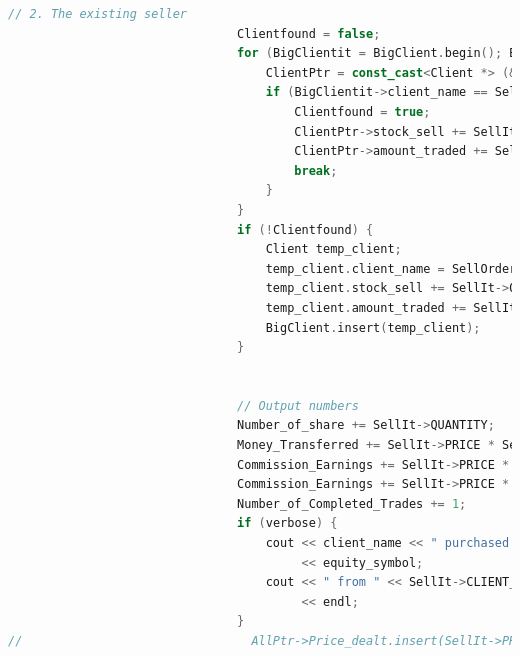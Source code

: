 \documentclass{article}
\begin{document}
\begin{lstlisting}[language=C++]
                                // 2. The existing seller
                                Clientfound = false;
                                for (BigClientit = BigClient.begin(); BigClientit != BigClient.end(); BigClientit++) {
                                    ClientPtr = const_cast<Client *> (&(*BigClientit));
                                    if (BigClientit->client_name == SellOrderPtr->CLIENT_NAME) {
                                        Clientfound = true;
                                        ClientPtr->stock_sell += SellIt->QUANTITY;
                                        ClientPtr->amount_traded += SellIt->QUANTITY * SellIt->PRICE;
                                        break;
                                    }
                                }
                                if (!Clientfound) {
                                    Client temp_client;
                                    temp_client.client_name = SellOrderPtr->CLIENT_NAME;
                                    temp_client.stock_sell += SellIt->QUANTITY;
                                    temp_client.amount_traded += SellIt->QUANTITY * SellIt->PRICE;
                                    BigClient.insert(temp_client);
                                }


                                // Output numbers
                                Number_of_share += SellIt->QUANTITY;
                                Money_Transferred += SellIt->PRICE * SellIt->QUANTITY;
                                Commission_Earnings += SellIt->PRICE * SellIt->QUANTITY / 100;
                                Commission_Earnings += SellIt->PRICE * SellIt->QUANTITY / 100;
                                Number_of_Completed_Trades += 1;
                                if (verbose) {
                                    cout << client_name << " purchased " << SellIt->QUANTITY << " shares of "
                                         << equity_symbol;
                                    cout << " from " << SellIt->CLIENT_NAME << " for $" << SellIt->PRICE << "/share"
                                         << endl;
                                }
//                                AllPtr->Price_dealt.insert(SellIt->PRICE);



\end{lstlisting}
\end{document}
